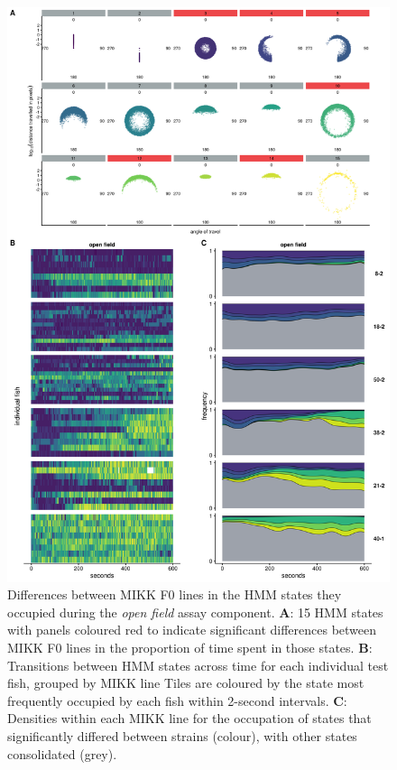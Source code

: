 \documentclass[
]{book}
\begin{document}
\begin{figure}
\includegraphics[width=1\linewidth]{figs/mikk_behaviour/select_0.08_15_dge_of} \caption{Differences between MIKK F0 lines in the HMM states they occupied during the \emph{open field} assay component. \textbf{A}: 15 HMM states with panels coloured red to indicate significant differences between MIKK F0 lines in the proportion of time spent in those states. \textbf{B}: Transitions between HMM states across time for each individual test fish, grouped by MIKK line Tiles are coloured by the state most frequently occupied by each fish within 2-second intervals. \textbf{C}: Densities within each MIKK line for the occupation of states that significantly differed between strains (colour), with other states consolidated (grey).}\label{fig:F2-time-dge-of}
\end{figure}
\end{document}
